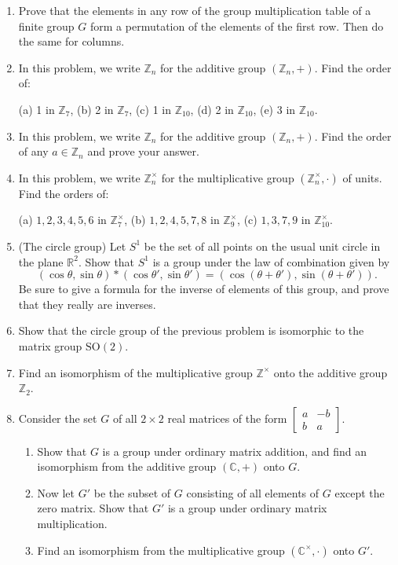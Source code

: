\documentclass[11pt]{article}
\newenvironment{problems}
{
 \begin{enumerate}[topsep=1pt,itemsep=0pt,parsep=2pt,leftmargin=0.6cm,%
 label={\arabic*.}, ref=\arabic*] \small
}
{
 \end{enumerate}
}
\theoremstyle{definition}
\newcommand{\R}{\mathbb{R}} %
\newcommand{\C}{\mathbb{C}} %
\newcommand{\Z}{\mathbb{Z}} %
\newcommand{\SO}{\mathrm{SO}}
\begin{document}
\begin{problems}
\item Prove that the elements in any row of the group multiplication
  table of a finite group $G$ form a permutation of the elements of
  the first row. Then do the same for columns. 

\item In this problem, we write $\Z_n$ for the additive group
  $(\Z_n,+)$. Find the order of:

(a) 1 in $\Z_7$, \qquad 
(b) 2 in $\Z_7$, \qquad 
(c) 1 in $\Z_{10}$, \qquad 
(d) 2 in $\Z_{10}$, \qquad 
(e) 3 in $\Z_{10}$.

\item In this problem, we write $\Z_n$ for the additive group
  $(\Z_n,+)$. Find the order of any $a \in \Z_n$ and prove your
  answer.

\item In this problem, we write $\Z_n^\times$ for the multiplicative
  group $(\Z_n^\times, \cdot)$ of units. Find the orders of:

(a) $1,2,3,4,5,6$ in $\Z_7^\times$, \qquad
(b) $1,2,4,5,7,8$ in $\Z_{9}^\times$, \qquad
(c) $1,3,7,9$ in $\Z_{10}^\times$.


\item\label{prob:circle-gp} (The circle group) Let $S^1$ be the set of
  all points on the usual unit circle in the plane $\R^2$.  Show that
  $S^1$ is a group under the law of combination given by
  \[
    (\cos \theta, \sin \theta) * (\cos \theta', \sin \theta') = (\cos
    (\theta + \theta'), \sin(\theta + \theta')).
  \] 
  Be sure to give a formula for the inverse of elements of this group,
  and prove that they really are inverses. 

\item Show that the circle group of the previous problem is isomorphic
  to the matrix group $\SO(2)$.


\item Find an isomorphism of the multiplicative group $\Z^\times$ onto
  the additive group $\Z_2$.



\item Consider the set $G$ of all $2 \times 2$ real matrices of the
  form $[\begin{smallmatrix} a&-b\\b&a \end{smallmatrix}]$.
  \begin{enumerate}
  \item Show that $G$ is a group under ordinary matrix addition, and
    find an isomorphism from the additive group $(\C, +)$ onto $G$.
  \item Now let $G'$ be the subset of $G$ consisting of all elements
    of $G$ except the zero matrix. Show that $G'$ is a group under
    ordinary matrix multiplication. 
  \item Find an isomorphism from the multiplicative group $(\C^\times,
    \cdot)$ onto $G'$.
  \end{enumerate}


\end{problems}
\end{document}

